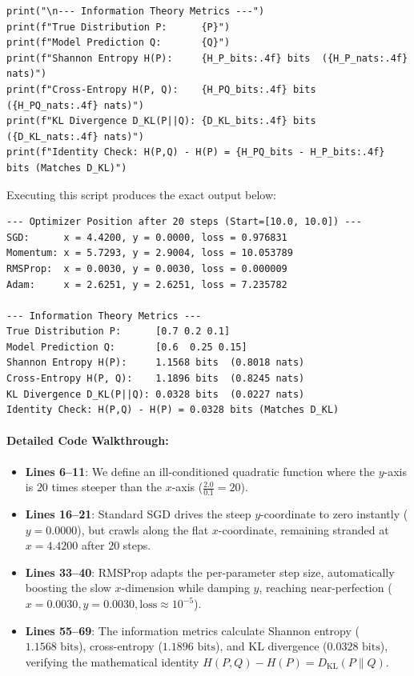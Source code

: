 \begin{lstlisting}[style=pythonstyle]
print("\n--- Information Theory Metrics ---")
print(f"True Distribution P:      {P}")
print(f"Model Prediction Q:       {Q}")
print(f"Shannon Entropy H(P):     {H_P_bits:.4f} bits  ({H_P_nats:.4f} nats)")
print(f"Cross-Entropy H(P, Q):    {H_PQ_bits:.4f} bits  ({H_PQ_nats:.4f} nats)")
print(f"KL Divergence D_KL(P||Q): {D_KL_bits:.4f} bits  ({D_KL_nats:.4f} nats)")
print(f"Identity Check: H(P,Q) - H(P) = {H_PQ_bits - H_P_bits:.4f} bits (Matches D_KL)")
\end{lstlisting}

Executing this script produces the exact output below:
\begin{lstlisting}[style=outputstyle]
--- Optimizer Position after 20 steps (Start=[10.0, 10.0]) ---
SGD:      x = 4.4200, y = 0.0000, loss = 0.976831
Momentum: x = 5.7293, y = 2.9004, loss = 10.053789
RMSProp:  x = 0.0030, y = 0.0030, loss = 0.000009
Adam:     x = 2.6251, y = 2.6251, loss = 7.235782

--- Information Theory Metrics ---
True Distribution P:      [0.7 0.2 0.1]
Model Prediction Q:       [0.6  0.25 0.15]
Shannon Entropy H(P):     1.1568 bits  (0.8018 nats)
Cross-Entropy H(P, Q):    1.1896 bits  (0.8245 nats)
KL Divergence D_KL(P||Q): 0.0328 bits  (0.0227 nats)
Identity Check: H(P,Q) - H(P) = 0.0328 bits (Matches D_KL)
\end{lstlisting}

\paragraph{Detailed Code Walkthrough:}
\begin{itemize}
    \item \textbf{Lines 6--11}: We define an ill-conditioned quadratic function where the $y$-axis is $20$ times steeper than the $x$-axis ($\frac{2.0}{0.1} = 20$).
    \item \textbf{Lines 16--21}: Standard SGD drives the steep $y$-coordinate to zero instantly ($y = 0.0000$), but crawls along the flat $x$-coordinate, remaining stranded at $x = 4.4200$ after $20$ steps.
    \item \textbf{Lines 33--40}: RMSProp adapts the per-parameter step size, automatically boosting the slow $x$-dimension while damping $y$, reaching near-perfection ($x = 0.0030, y = 0.0030, \text{loss} \approx 10^{-5}$).
    \item \textbf{Lines 55--69}: The information metrics calculate Shannon entropy ($1.1568\text{ bits}$), cross-entropy ($1.1896\text{ bits}$), and KL divergence ($0.0328\text{ bits}$), verifying the mathematical identity $H(P, Q) - H(P) = D_{\text{KL}}(P \parallel Q)$.
\end{itemize}

